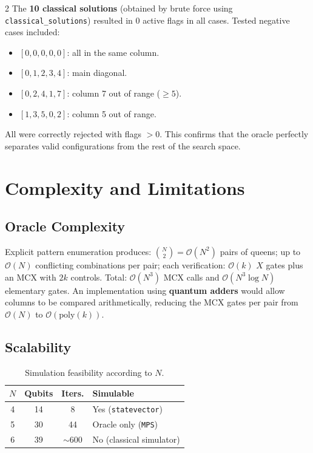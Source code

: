 \documentclass[9pt, a4paper]{extarticle}
\newcommand{\BigO}{\mathcal{O}}
\begin{document}
\begin{multicols}{2}
The \textbf{10 classical solutions} (obtained by brute force using \texttt{classical\_solutions}) resulted in 0 active flags in all cases.
Tested negative cases included:
\begin{itemize}
    \item $[0,0,0,0,0]$: all in the same column.
    \item $[0,1,2,3,4]$: main diagonal.
    \item $[0,2,4,1,7]$: column 7 out of range ($\geq 5$).
    \item $[1,3,5,0,2]$: column 5 out of range.
\end{itemize}
All were correctly rejected with flags $> 0$. This confirms that the oracle perfectly separates valid configurations from the rest of the search space.

\section{Complexity and Limitations}

\subsection{Oracle Complexity}

Explicit pattern enumeration produces: $\binom{N}{2} = \BigO(N^2)$ pairs of queens; up to $\BigO(N)$ conflicting combinations per pair; each verification: $\BigO(k)$ $X$ gates plus an MCX with $2k$ controls.
Total: $\BigO(N^3)$ MCX calls and $\BigO(N^3 \log N)$ elementary gates.
An implementation using \textbf{quantum adders} would allow columns to be compared arithmetically, reducing the MCX gates per pair from $\BigO(N)$ to $\BigO(\text{poly}(k))$.

\subsection{Scalability}

\begin{table}[H]
    \centering
    \caption{Simulation feasibility according to $N$.}
    \label{tab:scale}
    \scriptsize
    \begin{tabular}{@{}cccl@{}}
        \toprule
        $N$ & Qubits & Iters. & Simulable \\
        \midrule
        4 & 14 & 8    & Yes (\texttt{statevector}) \\
        5 & 30 & 44   & Oracle only (\texttt{MPS}) \\
        6 & 39 & $\sim$600 & No (classical simulator) \\
        \bottomrule
    \end{tabular}
\end{table}


\end{multicols}
\end{document}

